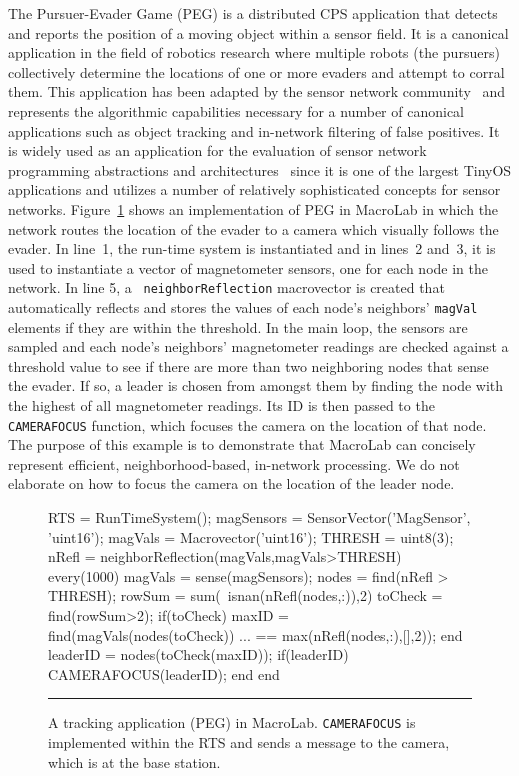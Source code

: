 The Pursuer-Evader Game (PEG) is a distributed CPS application that detects and
reports the position of a moving object within a sensor field.  It is a
canonical application in the field of robotics research where multiple robots
(the pursuers) collectively determine the locations of one or more evaders and
attempt to corral them. This application has been adapted by the sensor network
community~\cite{Sharp,Brooks,Li} and represents the algorithmic capabilities
necessary for a number of canonical applications such as object tracking and
in-network filtering of false positives. It is widely used as an application for
the evaluation of sensor network programming abstractions and
architectures~\cite{Whitehousea,Kothari,Gnawali} since it is one of the largest
TinyOS applications and utilizes a number of relatively sophisticated concepts
for sensor networks.  Figure~\ref{code:PEG} shows an implementation of PEG in
MacroLab in which the network routes the location of the evader to a camera
which visually follows the evader. In line~1, the run-time system is
instantiated and in lines~2 and~3, it is used to instantiate a vector of
magnetometer sensors, one for each node in the network.  In line 5, a {\tt
  neighborReflection} macrovector is created that automatically reflects and
stores the values of each node's neighbors' {\tt magVal} elements if they are
within the threshold.  In the main loop, the sensors are sampled and each node's
neighbors' magnetometer readings are checked against a threshold value to see if
there are more than two neighboring nodes that sense the evader. If so, a leader
is chosen from amongst them by finding the node with the highest of all
magnetometer readings. Its ID is then passed to the {\tt CAMERAFOCUS} function,
which focuses the camera on the location of that node.  The purpose of this
example is to demonstrate that MacroLab can concisely represent efficient,
neighborhood-based, in-network processing. We do not elaborate on how to focus
the camera on the location of the leader node.


\begin{figure}  
  \begin{macrolab}
RTS = RunTimeSystem();
magSensors = SensorVector('MagSensor', 'uint16');
magVals = Macrovector('uint16');
THRESH = uint8(3);
nRefl = neighborReflection(magVals,magVals>THRESH)
every(1000)
  magVals =  sense(magSensors);
  nodes = find(nRefl > THRESH);
  rowSum = sum(~isnan(nRefl(nodes,:)),2)
  toCheck = find(rowSum>2);
  if(toCheck)
    maxID = find(magVals(nodes(toCheck)) ...
                 == max(nRefl(nodes,:),[],2));
  end
  leaderID = nodes(toCheck(maxID));
  if(leaderID)
    CAMERAFOCUS(leaderID);
  end
end
  \end{macrolab}
  \smallskip
  \hrule width 1\columnwidth
  \caption[MacroLab implementation of PEG]{A tracking application (PEG) in MacroLab. {\tt CAMERAFOCUS} is implemented
  within the RTS and sends a message to the camera, which is at the base station.}
  \label{code:PEG}
\end{figure}



